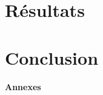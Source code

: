 \documentclass[10pt, a4paper, twocolumn]{article}
\theoremstyle{definition}
\theoremstyle{remark}
\begin{document}
\section{Résultats}


\section{Conclusion}


\printbibliography[title={Références}]


\onecolumn 
\newpage

\begin{center}
  {\large\bfseries\color{accentcolor} Annexes}
\end{center}
\vspace{0.5em}

\appendix

\end{document}
